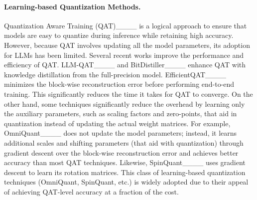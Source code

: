 \vspace{-2mm}
\paragraph{Learning-based Quantization Methods.} Quantization Aware Training (QAT)____ is a logical approach to ensure that models are easy to quantize during inference while retaining high accuracy. However, because QAT involves updating all the model parameters, its adoption for LLMs has been limited. Several recent works improve the performance and efficiency of QAT. LLM-QAT____ and BitDistiller____ enhance QAT with knowledge distillation from the full-precision model. EfficientQAT____ minimizes the block-wise reconstruction error before performing end-to-end training. This significantly reduces the time it takes for QAT to converge. On the other hand, some techniques significantly reduce the overhead by learning only the auxiliary parameters, such as scaling factors and zero-points, that aid in quantization instead of updating the actual weight matrices. For example, OmniQuant____ does not update the model parameters; instead, it learns additional scales and shifting parameters (that aid with quantization) through gradient descent over the block-wise reconstruction error and achieves better accuracy than most QAT techniques. Likewise, SpinQuant____ uses gradient descent to learn its rotation matrices. This class of learning-based quantization techniques (OmniQuant, SpinQuant, etc.) is widely adopted due to their appeal of achieving QAT-level accuracy at a fraction of the cost.

\vspace{-3mm}
